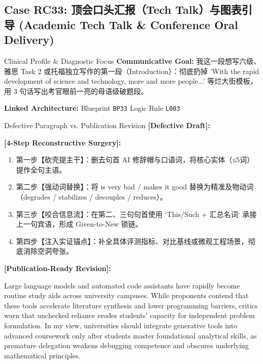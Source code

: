 \subsection{Case RC33: 顶会口头汇报（Tech Talk）与图表引导 (Academic Tech Talk \& Conference Oral Delivery)}\label{case:RC33}
\begin{ConceptBox}{Clinical Profile \& Diagnostic Focus}
\textbf{Communicative Goal:} 我这一段想写六级、雅思 Task 2 或托福独立写作的第一段（Introduction）：彻底扔掉 'With the rapid development of science and technology, more and more people...' 等烂大街模板，用 3 句话写出考官眼前一亮的母语级破题段。\par
\textbf{Linked Architecture:} Blueprint \texttt{BP33} \enspace\textbar\enspace Logic Rule \texttt{L003}
\end{ConceptBox}
\begin{ExampleBox}{Defective Paragraph vs. Publication Revision}
\textbf{\color{TargetHighlight}[Defective Draft]:}\par
{}\par\vspace{6pt}
\textbf{\color{AcadForest}[4-Step Reconstructive Surgery]:}
\begin{enumerate}[label=\textbf{\color{AcadNavy}Step \arabic*:}, leftmargin=2em]
  \item 第一步【砍壳提主干】：删去句首 AI 修辞帽与口语词，将核心实体（≤5词）提作全句主语。
  \item 第二步【强动词替换】：将 is very bad / makes it good 替换为精准及物动词（degrades / stabilizes / decouples / reduces）。
  \item 第三步【咬合信息流】：在第二、三句句首使用 `This/Such + 汇总名词` 承接上一句宾语，形成 Given-to-New 锁链。
  \item 第四步【注入实证锚点】：补全具体评测指标、对比基线或微观工程场景，彻底消除空洞夸张。
\end{enumerate}\vspace{4pt}
\textbf{\color{AcadNavy}[Publication-Ready Revision]:}\par
Large language models and automated code assistants have rapidly become routine study aids across university campuses. While proponents contend that these tools accelerate literature synthesis and lower programming barriers, critics warn that unchecked reliance erodes students' capacity for independent problem formulation. In my view, universities should integrate generative tools into advanced coursework only after students master foundational analytical skills, as premature delegation weakens debugging competence and obscures underlying mathematical principles.
\end{ExampleBox}
